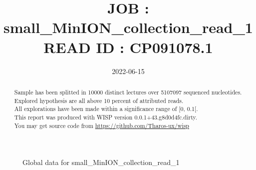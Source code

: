 \documentclass[12pt]{article}
\title{JOB : small\_MinION\_collection\_read\_1\\[0.2em]\smaller{}READ ID : CP091078.1}
\date{2022-06-15}
\begin{document}
\maketitle
\begin{abstract}
\begin{sloppypar}
Sample has been splitted in 10000 distinct lectures over 5107097 sequenced nucleotides.\\
Explored hypothesis are all above 10 percent of attributed reads.\\
All explorations have been made within a significance range of [0, 0.1[.\\
This report was produced with WISP version 0.0.1+43.g8d0d4fc.dirty. \\
You may get source code from \url{https://github.com/Tharos-ux/wisp}
\end{sloppypar}
\end{abstract}\begin{figure}[h]
\centering


\caption{Global data for small\_MinION\_collection\_read\_1}
\label{f-Global data for small\_MinION\_collection\_read\_1}
\end{figure}
\end{document}
